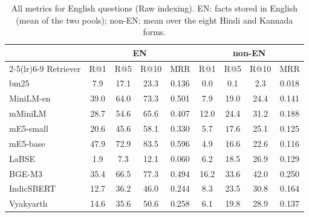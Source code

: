 \begin{table}[h]
\centering
\small
\caption{All metrics for English questions (Raw indexing). EN: facts stored in English (mean of the two pools); non-EN: mean over the eight Hindi and Kannada forms.}
\label{tab:full}
\begin{tabular}{@{}l cccc cccc@{}}
\toprule
 & \multicolumn{4}{c}{EN} & \multicolumn{4}{c}{non-EN} \\
\cmidrule(lr){2-5}\cmidrule(lr){6-9}
Retriever & R@1 & R@5 & R@10 & MRR & R@1 & R@5 & R@10 & MRR \\
\midrule
bm25 & 7.9 & 17.1 & 23.3 & 0.136 & 0.0 & 0.1 & 2.3 & 0.018 \\
MiniLM-en & 39.0 & 64.0 & 73.3 & 0.501 & 7.9 & 19.0 & 24.4 & 0.141 \\
mMiniLM & 28.7 & 54.6 & 65.6 & 0.407 & 12.0 & 24.4 & 31.2 & 0.188 \\
mE5-small & 20.6 & 45.6 & 58.1 & 0.330 & 5.7 & 17.6 & 25.1 & 0.125 \\
mE5-base & 47.9 & 72.9 & 83.5 & 0.596 & 4.9 & 16.6 & 22.6 & 0.116 \\
LaBSE & 1.9 & 7.3 & 12.1 & 0.060 & 6.2 & 18.5 & 26.9 & 0.129 \\
BGE-M3 & 35.4 & 66.5 & 77.3 & 0.494 & 16.2 & 33.6 & 42.0 & 0.250 \\
IndicSBERT & 12.7 & 36.2 & 46.0 & 0.244 & 8.3 & 23.5 & 30.8 & 0.164 \\
Vyakyarth & 14.6 & 35.6 & 50.6 & 0.258 & 6.1 & 19.8 & 28.9 & 0.137 \\
\bottomrule
\end{tabular}
\end{table}
